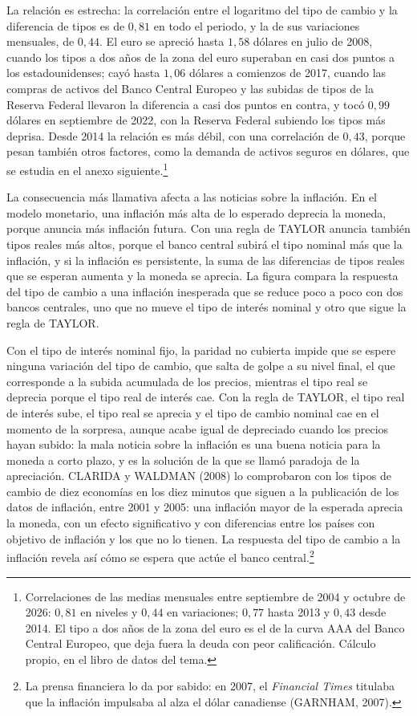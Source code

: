 \documentclass[10pt,a4paper]{article}
\newcounter{anexo}
\begin{document}
La relación es estrecha: la correlación entre el logaritmo del tipo de cambio y la diferencia de tipos es de $0{,}81$ en todo el periodo, y la de sus variaciones mensuales, de $0{,}44$. El euro se apreció hasta $1{,}58$ dólares en julio de 2008, cuando los tipos a dos años de la zona del euro superaban en casi dos puntos a los estadounidenses; cayó hasta $1{,}06$ dólares a comienzos de 2017, cuando las compras de activos del Banco Central Europeo y las subidas de tipos de la Reserva Federal llevaron la diferencia a casi dos puntos en contra, y tocó $0{,}99$ dólares en septiembre de 2022, con la Reserva Federal subiendo los tipos más deprisa. Desde 2014 la relación es más débil, con una correlación de $0{,}43$, porque pesan también otros factores, como la demanda de activos seguros en dólares, que se estudia en el anexo siguiente.\footnote{%
    Correlaciones de las medias mensuales entre septiembre de 2004 y octubre de 2026: $0{,}81$ en niveles y $0{,}44$ en variaciones; $0{,}77$ hasta 2013 y $0{,}43$ desde 2014. El tipo a dos años de la zona del euro es el de la curva AAA del Banco Central Europeo, que deja fuera la deuda con peor calificación. Cálculo propio, en el libro de datos del tema.
}

La consecuencia más llamativa afecta a las noticias sobre la inflación. En el modelo monetario, una inflación más alta de lo esperado deprecia la moneda, porque anuncia más inflación futura. Con una regla de TAYLOR anuncia también tipos reales más altos, porque el banco central subirá el tipo nominal más que la inflación, y si la inflación es persistente, la suma de las diferencias de tipos reales que se esperan aumenta y la moneda se aprecia. La figura compara la respuesta del tipo de cambio a una inflación inesperada que se reduce poco a poco con dos bancos centrales, uno que no mueve el tipo de interés nominal y otro que sigue la regla de TAYLOR.

Con el tipo de interés nominal fijo, la paridad no cubierta impide que se espere ninguna variación del tipo de cambio, que salta de golpe a su nivel final, el que corresponde a la subida acumulada de los precios, mientras el tipo real se deprecia porque el tipo real de interés cae. Con la regla de TAYLOR, el tipo real de interés sube, el tipo real se aprecia y el tipo de cambio nominal cae en el momento de la sorpresa, aunque acabe igual de depreciado cuando los precios hayan subido: la mala noticia sobre la inflación es una buena noticia para la moneda a corto plazo, y es la solución de la que se llamó paradoja de la apreciación. CLARIDA y WALDMAN (2008) lo comprobaron con los tipos de cambio de diez economías en los diez minutos que siguen a la publicación de los datos de inflación, entre 2001 y 2005: una inflación mayor de la esperada aprecia la moneda, con un efecto significativo y con diferencias entre los países con objetivo de inflación y los que no lo tienen. La respuesta del tipo de cambio a la inflación revela así cómo se espera que actúe el banco central.\footnote{%
    La prensa financiera lo da por sabido: en 2007, el \textit{Financial Times} titulaba que la inflación impulsaba al alza el dólar canadiense (GARNHAM, 2007).
}
\end{document}
